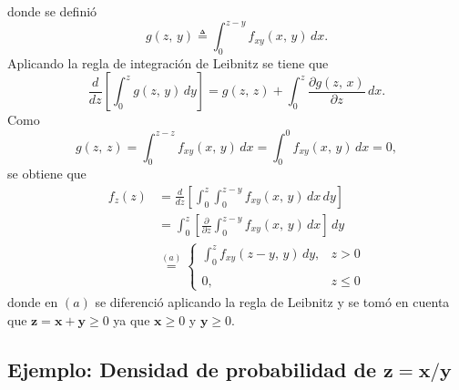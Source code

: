 \documentclass[a4paper]{report}
\newcommand{\x}{\mathbf{x}}
\newcommand{\y}{\mathbf{y}}
\newcommand{\z}{\mathbf{z}}
\begin{document}
donde se definió
\[
 g(z,\,y)\triangleq\int_{0}^{z-y}f_{xy}(x,\,y)\,dx.
\]
Aplicando la regla de integración de Leibnitz se tiene que
\[
 \frac{d}{dz}\left[\int_{0}^{z}g(z,\,y)\,dy\right]=g(z,\,z)+\int_{0}^{z}\frac{\partial g(z,\,x)}{\partial z}\,dx.
\]
Como 
\[
 g(z,\,z)=\int_{0}^{z-z}f_{xy}(x,\,y)\,dx=\int_{0}^{0}f_{xy}(x,\,y)\,dx=0,
\]
se obtiene que 
\begin{align*}
 f_z(z)&=\frac{d}{dz}\left[\int_{0}^{z}\int_{0}^{z-y}f_{xy}(x,\,y)\,dx\,dy\right]\\
   &=\int_{0}^{z}\left[\frac{\partial}{\partial z}\int_{0}^{z-y}f_{xy}(x,\,y)\,dx\right]\,dy\\
   &\overset{(a)}{=}\left\{\begin{array}{ll}
  \displaystyle\int_{0}^{z}f_{xy}(z-y,\,y)\,dy, & z > 0 \\
  \\
  0, & z\leq0
 \end{array} \right.
\end{align*}
donde en \((a)\) se diferenció aplicando la regla de Leibnitz y se tomó en cuenta que \(\z=\x+\y\geq0\) ya que \(\x\geq0\) y \(\y\geq0\).

\subsection{\texorpdfstring{Ejemplo: Densidad de probabilidad de \(\z=\x/\y\)}{}}
\end{document}
